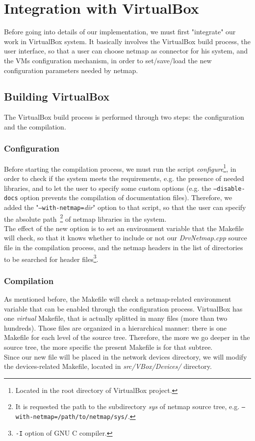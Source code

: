 \documentclass[a4paper, 12pt, titlepage]{report}
\begin{document}
\section{Integration with VirtualBox} \label{sec:integration}
Before going into details of our implementation, we must first "integrate" our work in VirtualBox system. It basically involves the VirtualBox build process, the user interface, so that a user can choose netmap as connector for his system, and the VMs configuration mechanism, in order to set/save/load the new configuration parameters needed by netmap.

\subsection{Building VirtualBox}
The VirtualBox build process is performed through two steps: the configuration and the compilation.

\subsubsection{Configuration}
Before starting the compilation process, we must run the script \textit{configure}\footnote{Located in the root directory of VirtualBox project.}, in order to check if the system meets the requirements, e.g. the presence of needed libraries, and to let the user to specify some custom options (e.g. the \texttt{--disable-docs} option prevents the compilation of documentation files). Therefore, we added the "\texttt{--with-netmap=}\textit{dir}" option to that script, so that the user can specify the absolute path~\footnote{It is requested the path to the subdirectory \textit{sys} of netmap source tree, e.g. \texttt{--with-netmap=/path/to/netmap/sys/}.} of netmap libraries in the system.
\\
The effect of the new option is to set an environment variable that the Makefile will check, so that it knows whether to include or not our \textit{DrvNetmap.cpp} source file in the compilation process, and the netmap headers in the list of directories to be searched for header files\footnote{\texttt{-I} option of GNU C compiler.}.

\subsubsection{Compilation}
As mentioned before, the Makefile will check a netmap-related environment variable that can be enabled through the configuration process. VirtualBox has one \textit{virtual} Makefile, that is actually splitted in many files (more than two hundreds). Those files are organized in a hierarchical manner: there is one Makefile for each level of the source tree. Therefore, the more we go deeper in the source tree, the more specific the present Makefile is for that subtree.
\\
Since our new file will be placed in the network devices directory, we will modify the devices-related Makefile, located in \textit{src/VBox/Devices/} directory.
\end{document}

